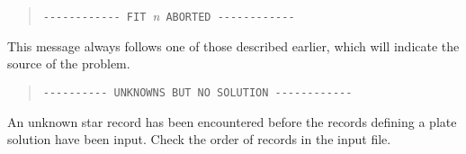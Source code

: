 \begin{quote}
\verb|------------ FIT |{\it n}\ \verb|ABORTED ------------|
\end{quote}
This message always follows one of those described earlier,
which will indicate the source of the problem.

\begin{quote}
\verb|---------- UNKNOWNS BUT NO SOLUTION ------------|
\end{quote}
An unknown star record has been encountered before the records defining
a plate solution have been input.  Check the order of records in the
input file.

